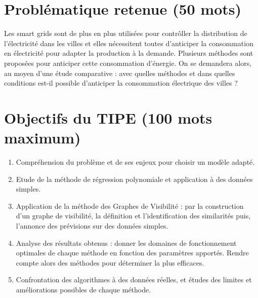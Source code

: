 \documentclass[12pt,a4paper]{article}
\begin{document}
\section*{Problématique retenue (50 mots)}
 Les smart grids sont de plus en plus utilisées pour contrôller la distribution de l'électricité dans les villes et elles nécessitent toutes d'anticiper la consommation en électricité pour adapter la production à la demande. Plusieurs méthodes sont proposées pour anticiper cette consommation d'énergie. On se demandera alors, au moyen d'une étude comparative : avec quelles méthodes et dans quelles conditions est-il possible d'anticiper la consommation électrique des villes ?
\section*{Objectifs du TIPE (100 mots maximum)}
\begin{enumerate}
    \item   Compréhension du problème et de ses enjeux pour choisir un modèle adapté.

    \item   Etude de la méthode de régression polynomiale et application à des données simples.
	
    \item   Application de la méthode des Graphes de Visibilité : par la construction d'un graphe de visibilité, la définition et l'identification des similarités puis, l'annonce des prévisions sur des données simples.
    
    \item	Analyse des résultats obtenus : donner les domaines de fonctionnement optimales de chaque méthode en fonction des paramètres apportés. Rendre compte alors des méthodes pour déterminer la plus efficaces.
    
    \item   Confrontation des algorithmes à des données réelles, et études des limites et améliorations possibles de chaque méthode.
\end{enumerate}
\end{document}

